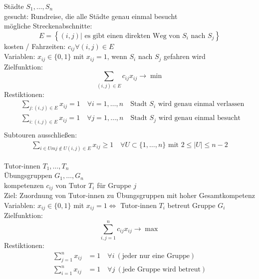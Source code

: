\begin{beispiel}\enter
	Städte $S_{1},\dots, S_{n}$\\
	gesucht: Rundreise, die alle Städte genau einmal besucht\\
	mögliche Streckenabschnitte:
	\begin{equation*}
		E = \left \{  (i,j) | \text{ es gibt einen direkten Weg von $S_{i}$ nach $S_{j}$}  \right \}
	\end{equation*}
	kosten / Fahrzeiten: $c_{ij} \forall (i,j) \in E$\\
	Variablen: $x_{ij} \in \{0,1\}$ mit $x_{ij}=1$, wenn $S_{i}$ nach $S_j$ gefahren wird\\
	Zielfunktion:
	\begin{equation*}
		\sum_{(i,j)\in E}  c_{ij}x_{ij} \rightarrow \min
	\end{equation*}
	Restiktionen:
	\begin{align*}
		&\sum_{j:(i,j)\in E} x_{ij}=1 \quad \forall i = 1,\dots,n\quad \text{Stadt $S_{i}$ wird genau einmal verlassen}\\
		&\sum_{i:(i,j)\in E} x_{ij}=1 \quad \forall j = 1,\dots,n \quad\text{Stadt $S_{j}$ wird genau einmal besucht}\\
	\end{align*}
	Subtouren ausschließen:
	\begin{align*}
		\sum_{i\in Um j \not\in U (i,j) \in E} x_{ij} \geq 1 \quad \forall U \subset \{1,\dots,n\} \text{ mit }2\leq |U|\leq n-2
	\end{align*}
\end{beispiel}

\begin{beispiel}\enter
	Tutor-innen $T_{1},\dots,T_{n}$ \\
	Übungsgruppen $G_{1},\dots, G_{n}$ \\
	kompetenzen $c_{ij}$ von Tutor $T_{i}$ für Gruppe $j$\\
	Ziel: Zuordnung von Tutor-innen zu Übungsgruppen mit hoher Gesamtkompetenz\\
	Variablen: $x_{ij}\in \{0,1\}$ mit $x_{ij}=1 \iff$ Tutor-innen $T_{i}$ betreut Gruppe $G_{i}$ \\
	Zielfunktion:
	\begin{equation*}
		\sum_{i,j=1}^{n}  c_{ij}x_{ij} \rightarrow \max
	\end{equation*}
	Restiktionen:
	\begin{align*}
		\sum_{j=1}^{n} x_{ij} &= 1\quad \forall i\ (\text{jeder nur eine Gruppe})\\
		\sum_{i=1}^{n} x_{ij} &= 1\quad \forall j\ (\text{jede Gruppe wird betreut})
	\end{align*}
\end{beispiel}

